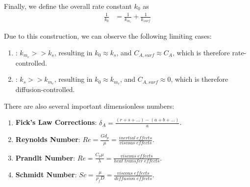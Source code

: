\documentclass{article}
\begin{document}
Finally, we define the overall rate constant \(k_0\) as
\begin{align*}
\frac{1}{k_0} &= \frac{1}{k_{m_c}} + \frac{1}{k_{surf}}
\end{align*}

Due to this construction, we can observe the following limiting cases:
\begin{enumerate}
    \item {}: \(k_{m_c} >> k_s\), resulting in \(k_0 \approx k_s\), and \(C_{A,surf} \approx C_A\), which is therefore rate-controlled.
    \item {}: \(k_{s} >> k_{m_c}\), resulting in \(k_0 \approx k_{m_c}\), and \(C_{A,surf} \approx 0\), which is therefore diffusion-controlled.
\end{enumerate}

There are also several important dimensionless numbers:
\begin{enumerate}
    \item \textbf{Fick's Law Corrections}: \(\delta_A = \frac{\left(r + s + ...\right) - \left(a + b + ...\right)}{a}\).
    \item \textbf{Reynolds Number}: \(Re = \frac{G d_p}{\mu} = \frac{inertial\;effects}{viscous\;effects}\).
    \item \textbf{Prandlt Number}: \(Re = \frac{C_p \mu}{\lambda} = \frac{viscous\;effects}{heat\;transfer\;effects}\).
    \item \textbf{Schmidt Number}: \(Sc = \frac{\mu}{\rho_f D} = \frac{viscous\;effects}{diffusion\;effects}\).
\end{enumerate}
\end{document}
